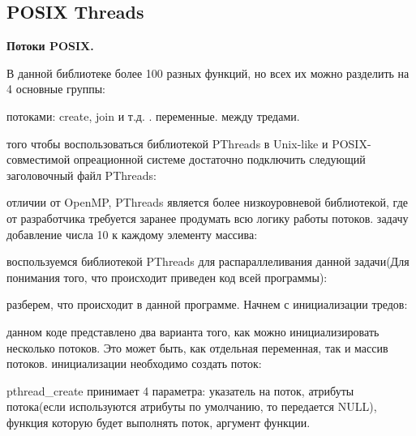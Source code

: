 { %
	\subsection{POSIX Threads}
	\label{PThreads:section}
	\par\textbf{Потоки POSIX.} 
    \par В данной библиотеке более 100 разных функций, но всех их можно разделить на 4 основные группы:
    \begin{itemize}
         потоками: create, join и т.д.
        .
         переменные.
         между тредами.
    \end{itemize}
     того чтобы воспользоваться библиотекой PThreads в Unix-like и POSIX-совместимой опреационной системе достаточно подключить следующий заголовочный файл PThreads:
    \begin{figure}[H]
		
	\end{figure}
	 отличии от OpenMP, PThreads является более низкоуровневой библиотекой, где от разработчика требуется заранее продумать всю логику работы потоков.
	 задачу добавление числа 10 к каждому элементу массива:
	\begin{figure}[H]
		
	\end{figure}
	 воспользуемся библиотекой PThreads для распараллеливания данной задачи(Для понимания того, что происходит приведен код всей программы):
	\begin{figure}[H]
		
	\end{figure}
	 разберем, что происходит в данной программе. Начнем с инициализации тредов:
	\begin{figure}[H]
		
	\end{figure}
	 данном коде представлено два варианта того, как можно инициализировать несколько потоков. Это может быть, как отдельная переменная, так и массив потоков.
	 инициализации необходимо создать поток:
	\begin{figure}[H]
		
	\end{figure}
	 pthread\_create принимает 4 параметра: указатель на поток, атрибуты потока(если используются атрибуты по умолчанию, то передается NULL), функция которую будет выполнять поток, аргумент функции.
	
}
